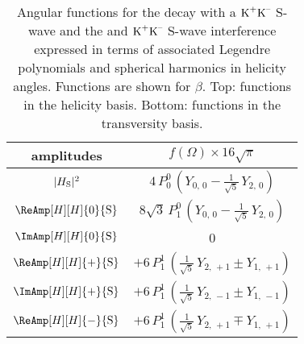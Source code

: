 \begin{table}[p]
  \centering
  \caption{Angular functions for the \BstoJpsiKK{} decay with a $\KK$ S-wave and the \BstoJpsiphi{} and $\KK$ S-wave interference
           expressed in terms of associated Legendre polynomials and spherical harmonics in helicity angles.
           Functions are shown for $\beta$\texteq{}.
           Top: functions in the helicity basis. Bottom: functions in the transversity basis.}
  \renewcommand{\arraystretch}{1.2}
  \label{tab:angDistSWavePY}
  \begin{tabular}{cc}
    \hline
    amplitudes                             &
      $f(\Omega) \times 16\sqrt{\pi}$      \\

    \hline

    $\AmpSq[H]{{\text{S}}}$  &
      $4\, P_0^0\, (Y_{0,\,0} - \tfrac{1}{\sqrt{5}}\, Y_{2,\,0})$  \\

    $\ReAmp[H][H]{0}{{\text{S}}}$  &
      $8\sqrt{3}\, P_1^0\, (Y_{0,\,0} - \tfrac{1}{\sqrt{5}}\, Y_{2,\,0})$  \\

    $\ImAmp[H][H]{0}{{\text{S}}}$  &
      0  \\

    $\ReAmp[H][H]{+}{{\text{S}}}$  &
      $+6\, P_1^1\, (\tfrac{1}{\sqrt{5}}\, Y_{2,\,+1} \pm Y_{1,\,+1})$  \\

    $\ImAmp[H][H]{+}{{\text{S}}}$  &
      $+6\, P_1^1\, (\tfrac{1}{\sqrt{5}}\, Y_{2,\,-1} \pm Y_{1,\,-1})$  \\

    $\ReAmp[H][H]{-}{{\text{S}}}$  &
      $+6\, P_1^1\, (\tfrac{1}{\sqrt{5}}\, Y_{2,\,+1} \mp Y_{1,\,+1})$  \\


\end{tabular}
\end{table}
